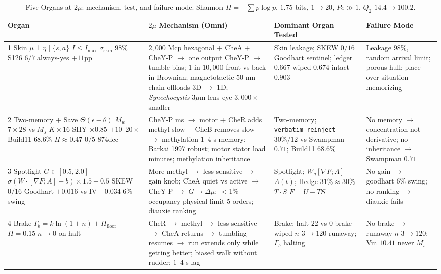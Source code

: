 \documentclass[11pt,a4paper]{article}
\begin{document}
\begin{table}[h]
\centering
\caption{Five Organs at $2\mu$: mechanism, test, and failure mode. Shannon $H = -\sum p \log p$, $1.75$ bits, $1 \to 20$, $Pe \gg 1$, $Q_2$ $14.4 \to 100.2$.}
\label{tab:five}
\small
\begin{tabular}{p{3.2cm} p{4.7cm} p{2.8cm} p{3.2cm}}
\toprule
Organ & $2\mu$ Mechanism (Omni) & Dominant Organ Tested & Failure Mode \\
\midrule
1 Skin $\mu \perp \eta \mid \{s,a\}$ $I \leq I_{\max}$ $\sigma_{\text{skin}}$ $98\%$ S126 $6/7$ always-yes $+11$pp & $2{,}000$ Mcp hexagonal $+$ CheA $+$ CheY-P $\to$ one output CheY-P $\to$ tumble bias; $1$ in $10{,}000$ front vs back in Brownian; magnetotactic $50$ nm chain offloads $3$D $\to$ $1$D; \textit{Synechocystis} $3\mu$m lens eye $3{,}000\times$ smaller & Skin leakage; SKEW $0/16$ Goodhart sentinel; ledger $0.667$ wiped $0.674$ intact $0.903$ & Leakage $98\%$, random arrival limit; porous hull; place over situation memorizing \\
\midrule
2 Two-memory $+$ Save $\Theta(\epsilon-\theta)$ $M_w$ $7{\times}28$ vs $M_s$ $K{\times}16$ SHY $\times 0.85$ $+10$--$20\times$ Build11 $68.6\%$ $H \approx 0.47$ $0/5$ $874\text{dcc}$ & CheY-P ms $\to$ motor $+$ CheR adds methyl slow $+$ CheB removes slow $\to$ methylation $1$--$4$ s memory; Barkai 1997 robust; motor stator load minutes; methylation inheritance & Two-memory; \texttt{verbatim\_reinject} $30\%/12$ vs Swampman $0.71$; Build11 $68.6\%$ & No memory $\to$ concentration not derivative; no inheritance $\to$ Swampman $0.71$ \\
\midrule
3 Spotlight $G \in [0.5,2.0]$ $\sigma(W\cdot[\nabla F;A]+b)\times 1.5+0.5$ SKEW $0/16$ Goodhart $+0.016$ vs IV $-0.034$ $6\%$ swing & More methyl $\to$ less sensitive $\to$ gain knob; CheA quiet vs active $\to$ CheY-P $\to$ $G \to \Delta \mu$; $<$1\% occupancy physical limit $5$ orders; diauxie ranking & Spotlight; $W_g[\nabla F;A]$ $A(t)$; Hedge $31\% \approx 30\%$ $T\cdot S$ $F=U-TS$ & No gain $\to$ goodhart $6\%$ swing; no ranking $\to$ diauxie fails \\
\midrule
4 Brake $\Gamma_b = k\ln(1+n)+H_{\text{floor}}$ $H=0.15$ $n\to 0$ on halt & CheR $\to$ methyl $\to$ less sensitive $\to$ CheA returns $\to$ tumbling resumes $\to$ run extends only while getting better; biased walk without rudder; $1$--$4$ s lag & Brake; halt $22$ vs $0$ brake wiped $n$ $3\to120$ runaway; $\Gamma_b$ halting & No brake $\to$ runaway $n$ $3\to120$; Vm $10.41$ never $M_s$ \\

\end{tabular}
\end{table}
\end{document}
